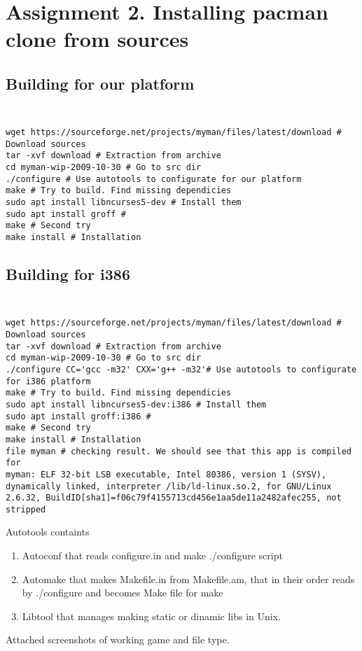 \documentclass[10pt]{article}
\begin{document}
\section{Assignment 2. Installing pacman clone from sources    \newline}
\subsection{Building for our platform \\ \\}
\begin{verbatim}
wget https://sourceforge.net/projects/myman/files/latest/download # Download sources
tar -xvf download # Extraction from archive
cd myman-wip-2009-10-30 # Go to src dir
./configure # Use autotools to configurate for our platform
make # Try to build. Find missing dependicies
sudo apt install libncurses5-dev # Install them
sudo apt install groff # 
make # Second try
make install # Installation
\end{verbatim}

\subsection{Building for i386 \\ \\}
\begin{verbatim}
wget https://sourceforge.net/projects/myman/files/latest/download # Download sources
tar -xvf download # Extraction from archive
cd myman-wip-2009-10-30 # Go to src dir
./configure CC='gcc -m32' CXX='g++ -m32'# Use autotools to configurate for i386 platform
make # Try to build. Find missing dependicies
sudo apt install libncurses5-dev:i386 # Install them
sudo apt install groff:i386 # 
make # Second try
make install # Installation
file myman # checking result. We should see that this app is compiled for 
myman: ELF 32-bit LSB executable, Intel 80386, version 1 (SYSV), dynamically linked, interpreter /lib/ld-linux.so.2, for GNU/Linux 2.6.32, BuildID[sha1]=f06c79f4155713cd456e1aa5de11a2482afec255, not stripped
\end{verbatim}

Autotools containts
\begin{enumerate}
\item Autoconf that reads configure.in and make ./configure script
\item Automake that makes Makefile.in from Makefile.am, that in their order reads by ./configure and becomes Make file for make
\item Libtool that manages making static or dinamic libs in Unix.
\end{enumerate}

Attached screenshots of working game and file type.
\end{document}
